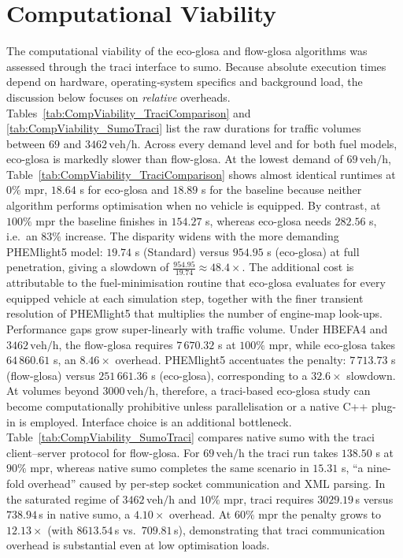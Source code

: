 \section{Computational Viability}
\label{sec:Results_Computational}

The computational viability of the \ac{eco-glosa} and \ac{flow-glosa} algorithms was assessed through the \ac{traci} interface to \ac{sumo}. Because absolute execution times depend on hardware, operating‐system specifics and background load, the discussion below focuses on \textit{relative} overheads. Tables~\ref{tab:CompViability_TraciComparison} and \ref{tab:CompViability_SumoTraci} list the raw durations for traffic volumes between $69$ and $3462\,\mathrm{veh/h}$.
\mynewline
Across every demand level and for both fuel models, \ac{eco-glosa} is markedly slower than \ac{flow-glosa}. At the lowest demand of $69\,\mathrm{veh/h}$, Table~\ref{tab:CompViability_TraciComparison} shows almost identical runtimes at $0\%$ \ac{mpr}, $18.64$ s for \ac{eco-glosa} and $18.89$ s for the baseline because neither algorithm performs optimisation when no vehicle is equipped. By contrast, at $100\%$ \ac{mpr} the baseline finishes in $154.27$ s, whereas \ac{eco-glosa} needs $282.56$ s, i.e.\ an $83\%$ increase. The disparity widens with the more demanding PHEMlight5 model: $19.74$ s (Standard) versus $954.95$ s (\ac{eco-glosa}) at full penetration, giving a slowdown of $\frac{954.95}{19.74}\approx 48.4\times$. The additional cost is attributable to the fuel-minimisation routine that \ac{eco-glosa} evaluates for every equipped vehicle at each simulation step, together with the finer transient resolution of PHEMlight5 that multiplies the number of engine-map look-ups.
\mynewline
Performance gaps grow super-linearly with traffic volume. Under HBEFA4 and $3462\,\mathrm{veh/h}$, the \ac{flow-glosa} requires $7\,670.32$ s at $100\%$ \ac{mpr}, while \ac{eco-glosa} takes $64\,860.61$ s, an $8.46\times$ overhead. PHEMlight5 accentuates the penalty: $7\,713.73$ s (\ac{flow-glosa}) versus $251\,661.36$ s (\ac{eco-glosa}), corresponding to a $32.6\times$ slowdown. At volumes beyond $3000\,\mathrm{veh/h}$, therefore, a \ac{traci}-based \ac{eco-glosa} study can become computationally prohibitive unless parallelisation or a native C++ plug-in is employed.
\mynewline
Interface choice is an additional bottleneck. Table~\ref{tab:CompViability_SumoTraci} compares native \ac{sumo} with the \ac{traci} client–server protocol for \ac{flow-glosa}. For $69\,\mathrm{veh/h}$ the \ac{traci} run takes $138.50$ s at $90\%$ \ac{mpr}, whereas native \ac{sumo} completes the same scenario in $15.31$ s, \enquote{a nine-fold overhead} caused by per-step socket communication and XML parsing. In the saturated regime of $3462\,\mathrm{veh/h}$ and $10\%$ \ac{mpr}, \ac{traci} requires $3029.19$\,s versus $738.94$\,s in native \ac{sumo}, a $4.10\times$ overhead. At $60\%$ \ac{mpr} the penalty grows to $12.13\times$ (with $8613.54$\,s vs.\ $709.81$\,s), demonstrating that \ac{traci} communication overhead is substantial even at low optimisation loads.  

